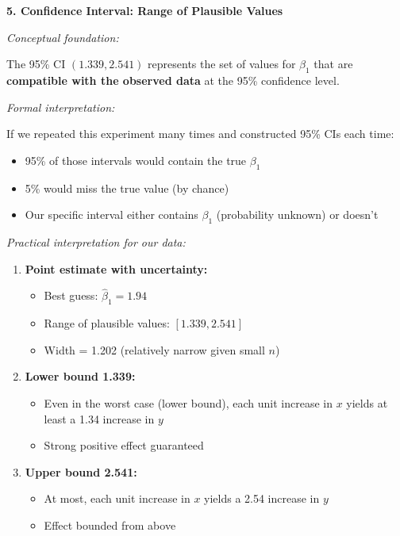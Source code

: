 \documentclass[12pt]{article}
\begin{document}
\begin{explanation}
\textbf{5. Confidence Interval: Range of Plausible Values}

\textit{Conceptual foundation:}

The 95\% CI $(1.339, 2.541)$ represents the set of values for $\beta_1$ that are \textbf{compatible with the observed data} at the 95\% confidence level.

\textit{Formal interpretation:}

If we repeated this experiment many times and constructed 95\% CIs each time:
\begin{itemize}
    \item 95\% of those intervals would contain the true $\beta_1$
    \item 5\% would miss the true value (by chance)
    \item Our specific interval either contains $\beta_1$ (probability unknown) or doesn't
\end{itemize}

\textit{Practical interpretation for our data:}

\begin{enumerate}
    \item \textbf{Point estimate with uncertainty:}
    \begin{itemize}
        \item Best guess: $\hat{\beta}_1 = 1.94$
        \item Range of plausible values: $[1.339, 2.541]$
        \item Width = 1.202 (relatively narrow given small $n$)
    \end{itemize}

    \item \textbf{Lower bound 1.339:}
    \begin{itemize}
        \item Even in the worst case (lower bound), each unit increase in $x$ yields at least a 1.34 increase in $y$
        \item Strong positive effect guaranteed
    \end{itemize}

    \item \textbf{Upper bound 2.541:}
    \begin{itemize}
        \item At most, each unit increase in $x$ yields a 2.54 increase in $y$
        \item Effect bounded from above
    \end{itemize}


\end{enumerate}
\end{explanation}
\end{document}
